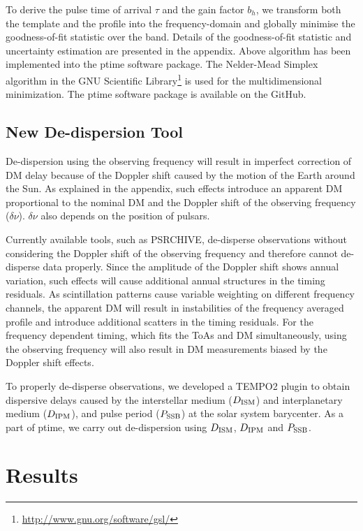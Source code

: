 \documentclass[useAMS,usenatbib]{mn2e}
\begin{document}
To derive the pulse time of arrival $\tau$ and the gain factor $b_{h}$, we transform 
both the template and the profile into the frequency-domain and globally minimise 
the goodness-of-fit statistic over the band. 
%
Details of the goodness-of-fit statistic and uncertainty estimation are presented
in the appendix.
%
Above algorithm has been implemented into the ptime software package. The 
Nelder-Mead Simplex algorithm in the GNU Scientific Library\footnote{\url{http://www.gnu.org/software/gsl/}} 
is used for the multidimensional minimization. The ptime software package
is available on the GitHub.

\subsection{New De-dispersion Tool}

De-dispersion using the observing frequency will result in imperfect correction 
of DM delay because of the Doppler shift caused by the motion of the Earth around 
the Sun. 
%
As explained in the appendix, such effects introduce an apparent DM proportional 
to the nominal DM and the Doppler shift of the observing frequency ($\delta\nu$).
$\delta\nu$ also depends on the position of pulsars.
%

Currently available tools, such as PSRCHIVE, de-disperse observations without 
considering the Doppler shift of the observing frequency and therefore cannot 
de-disperse data properly. Since the amplitude of the Doppler shift shows annual 
variation, such effects will cause additional annual structures in the timing 
residuals. As scintillation patterns cause variable weighting on 
different frequency channels, the apparent DM will result in instabilities of 
the frequency averaged profile and introduce additional scatters in the timing 
residuals. 
%
For the frequency dependent timing, which fits the ToAs and DM simultaneously, 
using the observing frequency will also result in DM measurements biased by 
the Doppler shift effects.

To properly de-disperse observations, we developed a TEMPO2 plugin to obtain 
dispersive delays caused by the interstellar medium ($D_{\rm{ISM}}$) and interplanetary 
medium ($D_{\rm{IPM}}$), and pulse period ($P_{\rm{SSB}}$) at the solar system 
barycenter. As a part of ptime, we carry out de-dispersion using $D_{\rm{ISM}}$, 
$D_{\rm{IPM}}$ and $P_{\rm{SSB}}$.

\section{Results}
\end{document}
